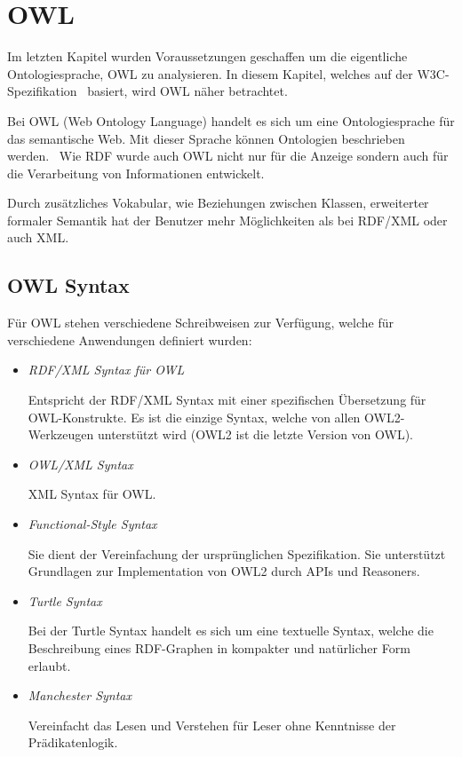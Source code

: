 \chapter{OWL}
\label{chap:owl}

Im letzten Kapitel wurden Voraussetzungen geschaffen um die eigentliche Ontologiesprache, OWL zu analysieren. In diesem Kapitel, welches auf der W3C-Spezifikation~\cite{w3owl} basiert, wird OWL näher betrachtet.

Bei OWL (Web Ontology Language) handelt es sich um eine Ontologiesprache für das semantische Web. Mit dieser Sprache können Ontologien beschrieben werden.~\cite{cambSemOWL} Wie RDF wurde auch OWL nicht nur für die Anzeige sondern auch für die Verarbeitung von Informationen entwickelt.

Durch zusätzliches Vokabular, wie Beziehungen zwischen Klassen, erweiterter formaler Semantik hat der Benutzer mehr Möglichkeiten als bei RDF/XML oder auch XML.\@

\section{OWL Syntax}
\label{sec:owl_owl_syntax}
Für OWL stehen verschiedene Schreibweisen zur Verfügung, welche für verschiedene Anwendungen definiert wurden:
\begin{itemize}
	\item \textit{RDF/XML Syntax für OWL}

        Entspricht der RDF/XML Syntax mit einer spezifischen Übersetzung für OWL-Konstrukte. Es ist die einzige Syntax, welche von allen OWL2-Werkzeugen unterstützt wird (OWL2 ist die letzte Version von OWL).
	\item \textit{OWL/XML Syntax}

        XML Syntax für OWL.\@
	\item \textit{Functional-Style Syntax}

        Sie dient der Vereinfachung der ursprünglichen Spezifikation. Sie unterstützt Grundlagen zur Implementation von OWL2 durch APIs und Reasoners.
	\item \textit{Turtle Syntax}

        Bei der Turtle Syntax handelt es sich um eine textuelle Syntax, welche die Beschreibung eines RDF-Graphen in kompakter und natürlicher Form erlaubt.

	\item \textit{Manchester Syntax}

        Vereinfacht das Lesen und Verstehen für Leser ohne Kenntnisse der Prädikatenlogik.
\end{itemize}

